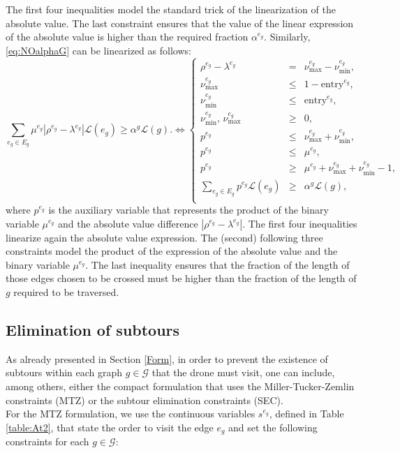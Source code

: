 \noindent
The first four inequalities model the standard trick of the linearization of the absolute value. The last constraint ensures that the value of the linear expression of the absolute value is higher than the required fraction $\alpha^{e_g}$.
\noindent
Similarly, \eqref{eq:NOalphaG} can be linearized as follows:
\begin{equation}\label{eq:NOalpha-G}\tag{$\alpha$-G}
 \sum_{e_g\in E_g} \mu^{e_g}|\rho^{e_g}-\lambda^{e_g}|\mathcal L(e_g)\geq \alpha^g\mathcal L(g). \Longleftrightarrow
 \left\{
 \begin{array}{ccl}
  \rho^{e_g} - \lambda^{e_g}                       & =    & \nu_\text{max}^{e_g} - \nu_\text{min}^{e_g},                                     \\
  \nu_\text{max}^{e_g}                         & \leq & 1-{\text{entry}^{e_g}},                                   \\
  \nu_\text{min}^{e_g}                      & \leq & {  \text{entry}^{e_g}},                                        \\
  \nu_\text{min}^{e_g}, \,\nu_\text{max}^{e_g} & \geq & 0, \\
  p^{e_g} & \leq & \nu_\text{max}^{e_g} + \nu_\text{min}^{e_g}, \\
  p^{e_g} & \leq & \mu^{e_g}, \\
  p^{e_g} & \geq & \mu^{e_g} + \nu_\text{max}^{e_g} + \nu_\text{min}^{e_g} - 1, \\
  \sum_{e_g\in E_g} p^{e_g}\mathcal L(e_g) & \geq & \alpha^{g}\mathcal L(g),
  \\
 \end{array}
 \right.
\end{equation}
where $p^{e_g}$ is the auxiliary variable that represents the product of the binary variable $\mu^{e_g}$ and the absolute value difference $|\rho^{e_g} - \lambda^{e_g}|$. The first four inequalities linearize again the absolute value expression. The (second) following three constraints model the product of the expression of the absolute value and the binary variable $\mu^{e_g}$. The last inequality ensures that the fraction of the length of those edges chosen to be crossed must be higher than the fraction of the length of $g$ required to be traversed.

\subsection*{Elimination of subtours}
\noindent
As already presented in Section \ref{Form}, in order to prevent the existence of subtours within each graph $g\in \mathcal G$ that the drone must visit, one can include, among others, either the compact formulation that uses the Miller-Tucker-Zemlin constraints (MTZ) or the subtour elimination constraints (SEC).\\
\noindent
For the MTZ formulation, we use the continuous variables $s^{e_g}$, defined in Table \ref{table:At2}, that state the order to visit the edge $e_g$ and set the following constraints for each $g\in\mathcal G$:

